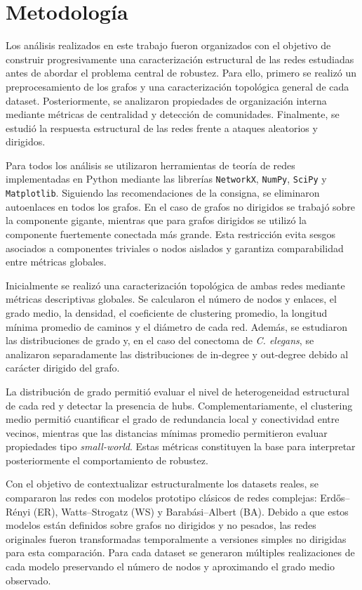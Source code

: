 \section{Metodología}

Los análisis realizados en este trabajo fueron organizados con el objetivo de construir progresivamente una caracterización estructural de las redes estudiadas antes de abordar el problema central de robustez. Para ello, primero se realizó un preprocesamiento de los grafos y una caracterización topológica general de cada dataset. Posteriormente, se analizaron propiedades de organización interna mediante métricas de centralidad y detección de comunidades. Finalmente, se estudió la respuesta estructural de las redes frente a ataques aleatorios y dirigidos.

Para todos los análisis se utilizaron herramientas de teoría de redes implementadas en Python mediante las librerías \texttt{NetworkX}, \texttt{NumPy}, \texttt{SciPy} y \texttt{Matplotlib}. Siguiendo las recomendaciones de la consigna, se eliminaron autoenlaces en todos los grafos. En el caso de grafos no dirigidos se trabajó sobre la componente gigante, mientras que para grafos dirigidos se utilizó la componente fuertemente conectada más grande. Esta restricción evita sesgos asociados a componentes triviales o nodos aislados y garantiza comparabilidad entre métricas globales.

Inicialmente se realizó una caracterización topológica de ambas redes mediante métricas descriptivas globales. Se calcularon el número de nodos y enlaces, el grado medio, la densidad, el coeficiente de clustering promedio, la longitud mínima promedio de caminos y el diámetro de cada red. Además, se estudiaron las distribuciones de grado y, en el caso del conectoma de \textit{C. elegans}, se analizaron separadamente las distribuciones de in-degree y out-degree debido al carácter dirigido del grafo.

La distribución de grado permitió evaluar el nivel de heterogeneidad estructural de cada red y detectar la presencia de hubs. Complementariamente, el clustering medio permitió cuantificar el grado de redundancia local y conectividad entre vecinos, mientras que las distancias mínimas promedio permitieron evaluar propiedades tipo \textit{small-world}. Estas métricas constituyen la base para interpretar posteriormente el comportamiento de robustez.

Con el objetivo de contextualizar estructuralmente los datasets reales, se compararon las redes con modelos prototipo clásicos de redes complejas: Erdős--Rényi (ER), Watts--Strogatz (WS) y Barabási--Albert (BA). Debido a que estos modelos están definidos sobre grafos no dirigidos y no pesados, las redes originales fueron transformadas temporalmente a versiones simples no dirigidas para esta comparación. Para cada dataset se generaron múltiples realizaciones de cada modelo preservando el número de nodos y aproximando el grado medio observado.

